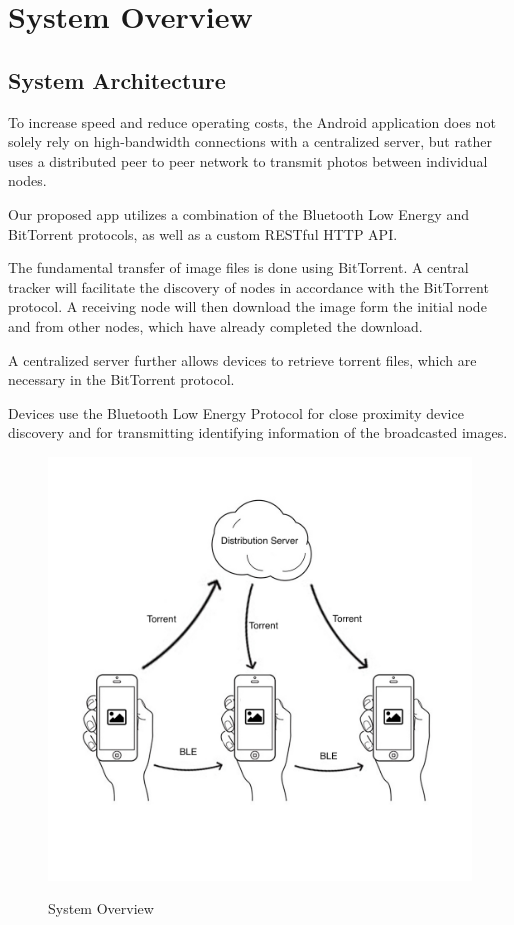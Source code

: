 \documentclass{report}
\newcommand{\lfig}[1]{\label{fig:#1}}
\begin{document}
\section{System Overview}

\subsection{System Architecture}
To increase speed and reduce operating costs, the Android application does not solely rely on high-bandwidth connections with a centralized server, but rather uses a distributed peer to peer network to transmit photos between individual nodes.

Our proposed app utilizes a combination of the Bluetooth Low Energy and BitTorrent protocols, as well as a custom RESTful HTTP API.

The fundamental transfer of image files is done using BitTorrent. A central tracker will facilitate the discovery of nodes in accordance with the BitTorrent protocol. A receiving node will then download the image form the initial node and from other nodes, which have already completed the download.

A centralized server further allows devices to retrieve torrent files, which are necessary in the BitTorrent protocol.

Devices use the Bluetooth Low Energy Protocol for close proximity device discovery and for transmitting identifying information of  the broadcasted images.

\begin{figure}[h]
	\centering
    \includegraphics[width=\columnwidth]{overview.jpg}
    \lfig{system-overview}
    \vspace{-5mm} %
	\caption{System Overview}
\end{figure}
\end{document}
